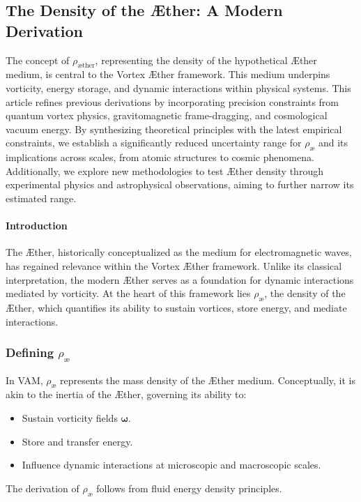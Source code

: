 \subsection{The Density of the Æther: A Modern Derivation}
The concept of $\rho_\text{æther}$, representing the density of the hypothetical Æther medium, is central to the Vortex Æther framework. This
medium underpins vorticity, energy storage, and dynamic interactions within physical systems. This article refines previous derivations by incorporating precision constraints from quantum vortex physics, gravitomagnetic frame-dragging, and cosmological vacuum energy. By synthesizing theoretical principles with the latest empirical constraints, we establish a significantly reduced uncertainty range for $\rho_\text{\ae}$ and its implications across scales, from atomic structures to cosmic phenomena. Additionally, we explore new methodologies to test Æther density through experimental physics and astrophysical observations, aiming to further narrow its estimated range.


\paragraph*{Introduction} The Æther, historically conceptualized as the medium for electromagnetic waves, has regained relevance within the Vortex Æther framework. Unlike its classical interpretation, the modern Æther serves as a foundation for dynamic interactions mediated by vorticity. At the heart of this framework lies $\rho_\text{\ae}$, the density of the Æther, which quantifies its ability to sustain vortices, store energy, and mediate interactions.

\subsubsection*{Defining $ \rho_\text{\ae} $}
In VAM, $ \rho_\text{\ae} $ represents the mass density of the Æther medium. Conceptually, it is akin to the inertia of the Æther, governing its ability to:

\begin{itemize}
    \item Sustain vorticity fields $ \mathbf{\omega} $.
    \item Store and transfer energy.
    \item Influence dynamic interactions at microscopic and macroscopic scales.
\end{itemize}
The derivation of $ \rho_\text{\ae} $ follows from fluid energy density principles.

